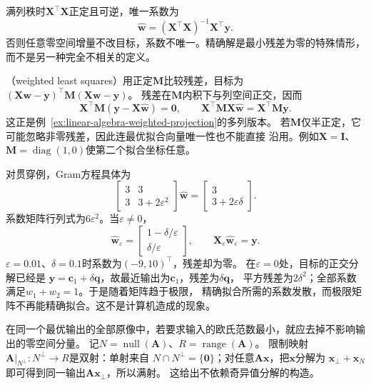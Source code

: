 满列秩时$\bm X^\top\bm X$正定且可逆，唯一系数为
\begin{equation}
 \widehat{\bm w}=(\bm X^\top\bm X)^{-1}\bm X^\top\bm y.
 \label{eq:linear-algebra-full-rank-least-squares}
\end{equation}
否则任意零空间增量不改目标，系数不唯一。精确解是最小残差为零的特殊情形，
而不是另一种完全不相关的定义。

（weighted least squares）用正定$\bm M$比较残差，目标为
$(\bm X\bm w-\bm y)^\top\bm M(\bm X\bm w-\bm y)$。
残差在$\bm M$内积下与列空间正交，因而
\begin{equation}
 \bm X^\top\bm M(\bm y-\bm X\widehat{\bm w})=\bm0,\qquad
 \bm X^\top\bm M\bm X\widehat{\bm w}=\bm X^\top\bm M\bm y.
 \label{eq:linear-algebra-weighted-normal-equations}
\end{equation}
这正是例~\ref{ex:linear-algebra-weighted-projection}的多列版本。
若$\bm M$仅半正定，它可能忽略非零残差，因此连最优拟合向量唯一性也不能直接
沿用。例如$\bm X=\bm I$、$\bm M=\operatorname{diag}(1,0)$使第二个拟合坐标任意。

对贯穿例，Gram方程具体为
\[
 \begin{bmatrix}3&3\\3&3+2\varepsilon^2\end{bmatrix}\widehat{\bm w}
 =\begin{bmatrix}3\\3+2\varepsilon\delta\end{bmatrix}.
\]
系数矩阵行列式为$6\varepsilon^2$。当$\varepsilon\neq0$，
\begin{equation}
 \widehat{\bm w}_\varepsilon
 =\begin{bmatrix}1-\delta/\varepsilon\\\delta/\varepsilon\end{bmatrix},
 \qquad\bm X_\varepsilon\widehat{\bm w}_\varepsilon=\bm y.
 \label{eq:linear-algebra-nearly-collinear-least-squares}
\end{equation}
$\varepsilon=0.01$、$\delta=0.1$时系数为$(-9,10)^\top$，残差却为零。
在$\varepsilon=0$处，目标的正交分解已经是
$\bm y=\bm c_1+\delta\bm q$，故最近输出为$\bm c_1$，残差为$\delta\bm q$，
平方残差为$2\delta^2$；全部系数满足$w_1+w_2=1$。于是随着矩阵趋于极限，
精确拟合所需的系数发散，而极限矩阵不再能精确拟合。这不是计算机造成的现象。


在同一个最优输出的全部原像中，若要求输入的欧氏范数最小，就应去掉不影响输出的零空间分量。
记$N=\operatorname{null}(\bm A)$、$R=\operatorname{range}(\bm A)$。
限制映射$\bm A|_{N^\perp}:N^\perp\to R$是双射：单射来自
$N\cap N^\perp=\{\bm0\}$；对任意$\bm A\bm x$，把$\bm x$分解为
$\bm x_\perp+\bm x_N$即可得到同一输出$\bm A\bm x_\perp$，所以满射。
这给出不依赖奇异值分解的构造。

